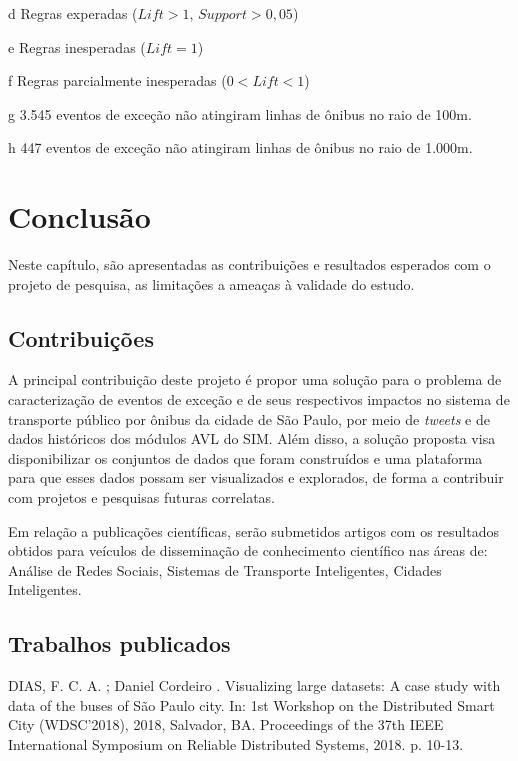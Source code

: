 \documentclass[
	12pt,				%
	oneside,			%
	a4paper,			%
	english,			%
	brazil				%
	]{abntex2ppgsi}
\begin{document}
{{\begin{table}[!htb]
\begin{threeparttable}
\begin{tablenotes}
            \item[d] Regras experadas ($Lift > 1$, $Support > 0,05$)
            \item[e] Regras inesperadas ($Lift = 1$)
            \item[f] Regras parcialmente inesperadas ($0 < Lift < 1$)
            \item[g] 3.545 eventos de exceção não atingiram linhas de ônibus no raio de 100m.
            \item[h] 447 eventos de exceção não atingiram linhas de ônibus no raio de 1.000m.
        \end{tablenotes}
\end{threeparttable}
\end{table}

\chapter{Conclusão}
\label{conclusion}

Neste capítulo, são apresentadas as contribuições e resultados esperados com o projeto de pesquisa, as limitações a ameaças à validade do estudo. 

\section{Contribuições}

A principal contribuição deste projeto é propor uma solução para o problema de caracterização de eventos de exceção e de seus respectivos impactos no sistema de transporte público por ônibus da cidade de São Paulo, por meio de \textit{tweets} e de dados históricos dos módulos AVL do SIM. Além disso, a solução proposta visa disponibilizar os conjuntos de dados que foram construídos e uma plataforma para que esses dados possam ser visualizados e explorados, de forma a contribuir com projetos e pesquisas futuras correlatas.

Em relação a publicações científicas, serão submetidos artigos com os resultados obtidos para veículos de disseminação de conhecimento científico nas áreas de: Análise de Redes Sociais, Sistemas de Transporte Inteligentes, Cidades Inteligentes.

\section{Trabalhos publicados}

DIAS, F. C. A. ; Daniel Cordeiro . Visualizing large datasets: A case study with data of the buses of São Paulo city. In: 1st Workshop on the Distributed Smart City (WDSC'2018), 2018, Salvador, BA. Proceedings of the 37th IEEE International Symposium on Reliable Distributed Systems, 2018. p. 10-13.

}}
\end{document}
